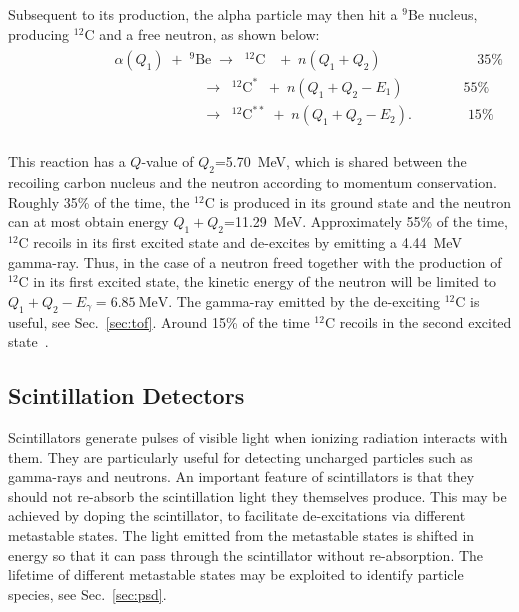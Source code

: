 \documentclass[main.tex]{subfiles}
\begin{document}
Subsequent to its production, the alpha particle may then hit a $^{\textrm{9}}$Be nucleus, producing $^{12}$C and a free neutron, as shown below:
\begin{align}
	\begin{split}
		&\phantom{\qquad\qquad\qquad}\alpha(Q_1) \;+\; ^{9}\textrm{Be} \;\rightarrow\;\; ^{12}\textrm{C} \;\;\;+\; n(Q_1+Q_2)\qquad\qquad\qquad\;\;\; 35\%\\
		&\phantom{\qquad\qquad\qquad\qquad\qquad\qquad\;}\rightarrow\;\;^{12}\textrm{C}^* \;\;+\; n(Q_1+Q_2- E_1)\qquad \qquad\; 55\%\\
		&\phantom{\qquad\qquad\qquad\qquad\qquad\qquad\;}\rightarrow\;\;^{12}\textrm{C}^{**} \;+\; n(Q_1+Q_2- E_2).\qquad\qquad 15\%\\
	\label{eq:alphaBe}
	\end{split}
\end{align}

This reaction has a $Q$-value of $Q_2$=\SI{5.70}{\MeV}, which is shared between the recoiling carbon nucleus and the neutron according to momentum conservation. 
Roughly 35\% of the time, the $^{12}$C is produced in its ground state and the neutron can at most obtain energy $Q_1+Q_2$=\SI{11.29}{\MeV}. 
Approximately 55\% of the time, $^{12}$C recoils in its first excited state and de-excites by emitting a \SI{4.44}{\MeV} gamma-ray. 
Thus, in the case of a neutron freed together with the production of $^{12}$C in its first excited state, the kinetic energy of the neutron will be limited to $Q_1+Q_2-E_\gamma=\SI{6.85}{\MeV}$. The gamma-ray emitted by the de-exciting $^{12}$C is useful, see Sec.~\ref{sec:tof}.
Around 15\% of the time $^{12}$C recoils in the second excited state~\cite{Scherzinger:2015}.
	
\subsection{Scintillation Detectors}
Scintillators generate pulses of visible light when ionizing radiation interacts with them. They are particularly useful for detecting uncharged particles such as gamma-rays and neutrons. An important feature of scintillators is that they should not re-absorb the scintillation light they themselves produce. 
This may be achieved by doping the scintillator, to facilitate de-excitations via different metastable states. 
The light emitted from the metastable states is shifted in energy so that it can pass through the scintillator without re-absorption. The lifetime of different metastable states may be exploited to identify particle species, see Sec.~\ref{sec:psd}.
\end{document}
